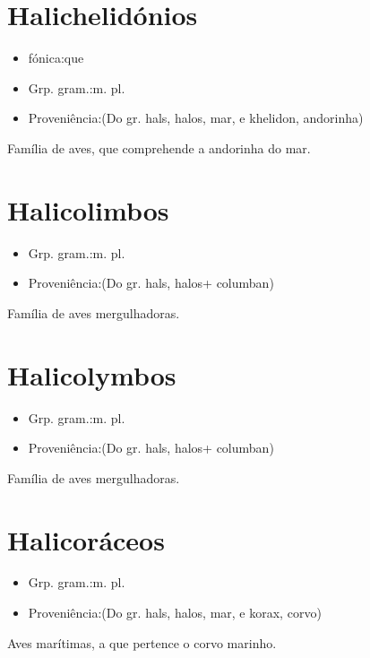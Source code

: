 \documentclass{article}
\begin{document}
\section{Halichelidónios}
\begin{itemize}
\item {fónica:que}
\end{itemize}
\begin{itemize}
\item {Grp. gram.:m. pl.}
\end{itemize}
\begin{itemize}
\item {Proveniência:(Do gr. \textunderscore hals\textunderscore , \textunderscore halos\textunderscore , mar, e \textunderscore khelidon\textunderscore , andorinha)}
\end{itemize}
Família de aves, que comprehende a andorinha do mar.
\section{Halicolimbos}
\begin{itemize}
\item {Grp. gram.:m. pl.}
\end{itemize}
\begin{itemize}
\item {Proveniência:(Do gr. \textunderscore hals\textunderscore , \textunderscore halos\textunderscore  + \textunderscore columban\textunderscore )}
\end{itemize}
Família de aves mergulhadoras.
\section{Halicolymbos}
\begin{itemize}
\item {Grp. gram.:m. pl.}
\end{itemize}
\begin{itemize}
\item {Proveniência:(Do gr. \textunderscore hals\textunderscore , \textunderscore halos\textunderscore  + \textunderscore columban\textunderscore )}
\end{itemize}
Família de aves mergulhadoras.
\section{Halicoráceos}
\begin{itemize}
\item {Grp. gram.:m. pl.}
\end{itemize}
\begin{itemize}
\item {Proveniência:(Do gr. \textunderscore hals\textunderscore , \textunderscore halos\textunderscore , mar, e \textunderscore korax\textunderscore , corvo)}
\end{itemize}
Aves marítimas, a que pertence o corvo marinho.
\end{document}
